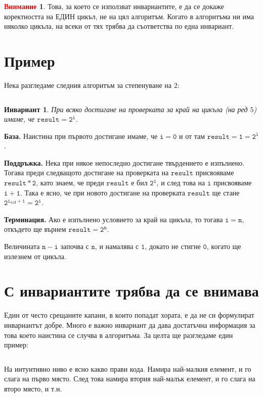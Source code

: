 \documentclass{article}
\theoremstyle{definition}
\newtheorem*{warning}{\textcolor{red}{Внимание}}
\theoremstyle{plain}
\newtheorem*{invariant}{Инвариант}
\theoremstyle{remark}
\theoremstyle{definition}
\begin{document}
\begin{warning}
    Това, за което се използват инвариантите, е да се докаже коректността на ЕДИН цикъл, не на цял алгоритъм.
    Когато в алгоритъма ни има няколко цикъла, на всеки от тях трябва да съответства по една инвариант.
\end{warning}

\section*{Пример}

Нека разгледаме следния алгоритъм за степенуване на $2$:
\inputminted[linenos]{c++}{algorithms/pow2.cpp}

\begin{invariant}
    При всяко достигане на проверката за край на цикъла (на ред $5$) имаме, че $\mathtt{result = 2^i}$.
\end{invariant}

\textbf{База.}
Наистина при първото достигане имаме, че $\mathtt{i = 0}$ и от там $\mathtt{result = 1 = 2^i}$.

\textbf{Поддръжка.}
Нека при някое непоследно достигане твърдението е изпълнено.
Тогава преди следващото достигане на проверката на $\mathtt{result}$ присвояваме $\mathtt{result * 2}$, като знаем, че преди $\mathtt{result}$ е бил $\mathtt{2^i}$, и след това на $\mathtt{i}$ присвояваме $\mathtt{i + 1}$.
Така е ясно, че при новото достигане на проверката $\mathtt{result}$ ще стане $\mathtt{2^{i_{old} + 1} = 2^i}$.

\textbf{Терминация.}
Ако е изпълнено условието за край на цикъла, то тогава $\mathtt{i = n}$, откъдето ще върнем $\mathtt{result = 2^n}$.

Величината $\mathtt{n - i}$ започва с $\mathtt{n}$, и намалява с $\mathtt{1}$, докато не стигне $\mathtt{0}$, когато ще излезнем от цикъла.

\section*{С инвариантите трябва да се внимава}

Един от често срещаните капани, в които попадат хората, е да не си формулират инвариантът добре.
Много е важно инвариант да дава достатъчна информация за това което наистина се случва в алгоритъма.
За целта ще разгледаме един пример:
\inputminted[linenos]{c++}{algorithms/selection_sort.cpp}

На интуитивно ниво е ясно какво прави кода.
Намира най-малкия елемент, и го слага на първо място.
След това намира втория най-малък елемент, и го слага на второ място, и т.н.
\end{document}
